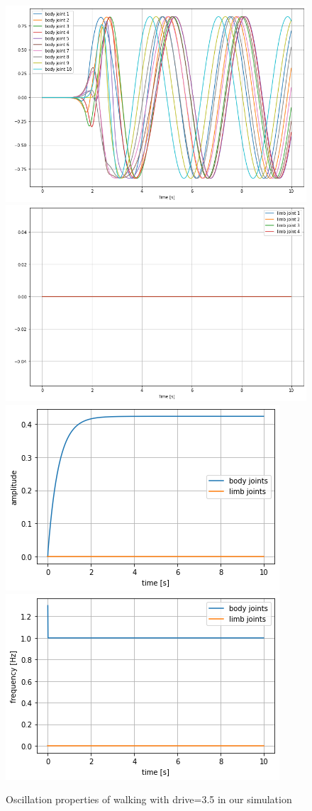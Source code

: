 \documentclass{cmc}
\begin{document}
\begin{figure}[H]
\centering
\includegraphics[height=0.3\columnwidth]{figures/8a_d35_spine.png}
\includegraphics[height=0.3\columnwidth]{figures/8a_d35_limb.png}
\includegraphics[height=0.3\columnwidth]{figures/8a_d35_amp.png}
\includegraphics[height=0.3\columnwidth]{figures/8a_d35_freq.png}
\caption{Oscillation properties of walking with drive=3.5 in our simulation}
\label{a3}
\end{figure}
\end{document}
